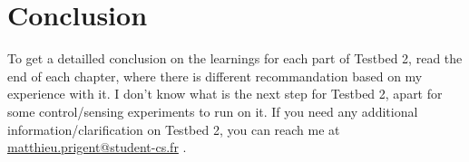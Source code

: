 \documentclass{article}
\begin{document}
\section{Conclusion}
To get a detailled conclusion on the learnings for each part of Testbed 2, read the end of each chapter, where there is different recommandation based on my experience with it. I don't know what is the next step for Testbed 2, apart for some control/sensing experiments to run on it. If you need any additional information/clarification on Testbed 2, you can reach me at \href{mailto:matthieu.prigent@student-cs.fr}{matthieu.prigent@student-cs.fr} .
\end{document}
